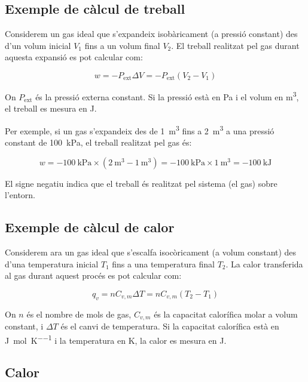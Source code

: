 \subsection{Exemple de càlcul de treball}

Considerem un gas ideal que s'expandeix isobàricament (a pressió constant) des d'un volum inicial $V_1$ fins a un volum final $V_2$. El treball realitzat pel gas durant aquesta expansió es pot calcular com:

\[
w = -P_{\text{ext}} \Delta V = -P_{\text{ext}} (V_2 - V_1)
\]

On $P_{\text{ext}}$ és la pressió externa constant. Si la pressió està en \si{\pascal} i el volum en \si{\meter\cubed}, el treball es mesura en \si{\joule}.

Per exemple, si un gas s'expandeix des de \qty{1}{\meter\cubed} fins a \qty{2}{\meter\cubed} a una pressió constant de \qty{100}{\kilo\pascal}, el treball realitzat pel gas és:

\[
w = -\qty{100}{\kilo\pascal} \times (\qty{2}{\meter\cubed} - \qty{1}{\meter\cubed}) = -\qty{100}{\kilo\pascal} \times \qty{1}{\meter\cubed} = -\qty{100}{\kilo\joule}
\]

El signe negatiu indica que el treball és realitzat pel sistema (el gas) sobre l'entorn.

\subsection{Exemple de càlcul de calor}

Considerem ara un gas ideal que s'escalfa isocòricament (a volum constant) des d'una temperatura inicial $T_1$ fins a una temperatura final $T_2$. La calor transferida al gas durant aquest procés es pot calcular com:

\[
q_v = n C_{v,m} \Delta T = n C_{v,m} (T_2 - T_1)
\]

On $n$ és el nombre de mols de gas, $C_{v,m}$ és la capacitat calorífica molar a volum constant, i $\Delta T$ és el canvi de temperatura. Si la capacitat calorífica està en \si{\joule\per\mole\per\kelvin} i la temperatura en \si{\kelvin}, la calor es mesura en \si{\joule}.

\subsection{Calor}

